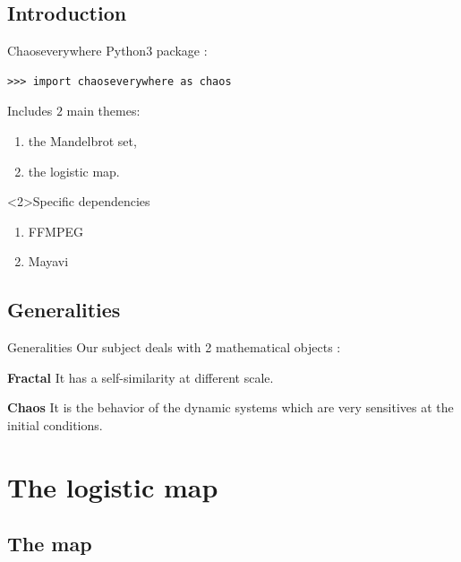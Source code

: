 \documentclass[11pt, compress, tikz]{beamer}
\theoremstyle{definition}
\begin{document}
\subsection{Introduction}
\begin{frame}[fragile]{Chaoseverywhere}
Python3 package : \href{https://github.com/tanglef/chaoseverywhere}{}
%
\begin{verbatim}
>>> import chaoseverywhere as chaos
\end{verbatim}
Includes $2$ main themes:
\begin{enumerate}[label=$\bullet$]
    \item the Mandelbrot set,  %
    \item the logistic map. %
\end{enumerate}
\begin{block}<2>{Specific dependencies}
\begin{enumerate}[label=\ding{51}]
\item FFMPEG
\item Mayavi
\end{enumerate}
\end{block}
\end{frame}

\subsection{Generalities}
\begin{frame}[fragile]{Generalities}
Our subject deals with 2 mathematical objects :
\begin{block}{\textbf{Fractal}}
    It has a self-similarity at different scale.
\end{block}
\begin{block}{\textbf{Chaos}}
It is the behavior of the dynamic systems which are very sensitives at the initial conditions.
\end {block}
\end{frame}

\section[Logistic map]{The logistic map}
\subsection{The map}
\end{document}
